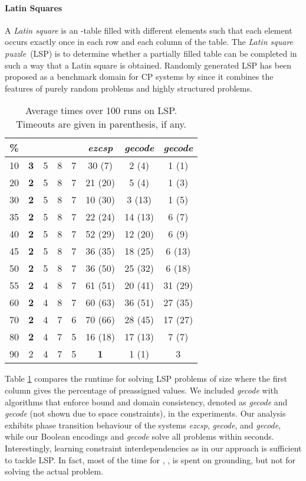 \documentclass[letterpaper]{article}
\newcommand{\systemname}[1]{\textit{#1}}
\newcommand{\encsup}{}
\newcommand{\encbou}{}
\newcommand{\encran}{}
\newcommand{\encbouh}[1]{\encbou}
\begin{document}
\paragraph{Latin Squares}
A \emph{Latin square} is an -table filled with  different elements such that each element occurs exactly once in each row and each column of the table. The \emph{Latin square puzzle}~(LSP) is to determine whether a partially filled table can be completed in such a way that a Latin square is obtained.
Randomly generated LSP has been proposed as a benchmark domain for CP systems by \citeauthor{gose97a} since it combines the features of purely random problems and highly structured problems.
\begin{table}
\centering
\begin{tabular}{cccccccc} \hline\hline
\% & \encsup & \encbouh{3} & \encbou & \encran & \systemname{ezcsp} & \systemname{gecode} & \systemname{gecode} \\ \hline
10 & \textbf{3} & 5 & 8 & 7 &30 (7)  & 2 (4) & 1 (1) \\
20 & \textbf{2} & 5 & 8 & 7 &21 (20) & 5 (4) & 1 (3) \\
30 & \textbf{2} & 5 & 8 & 7 &10 (30) & 3 (13) & 1 (5) \\
35 & \textbf{2} & 5 & 8 & 7 &22 (24) &14 (13) & 6 (7) \\
40 & \textbf{2} & 5 & 8 & 7 &52 (29) &12 (20) & 6 (9) \\
45 & \textbf{2} & 5 & 8 & 7 &36 (35) &18 (25) & 6 (13) \\
50 & \textbf{2} & 5 & 8 & 7 &36 (50) &25 (32) & 6 (18) \\
55 & \textbf{2} & 4 & 8 & 7 &61 (51) &20 (41) &31 (29) \\
60 & \textbf{2} & 4 & 8 & 7 &60 (63) &36 (51) &27 (35) \\
70 & \textbf{2} & 4 & 7 & 6 &70 (66) &28 (45) &17 (27) \\
80 & \textbf{2} & 4 & 7 & 5 &16 (18) &17 (13) & 7 (7) \\
90 & 2 & 4 & 7 & 5 & \textbf{1} & 1 (1) & 3 \\ \hline\hline
\end{tabular}
\caption{Average times over 100 runs on LSP. Timeouts are given in parenthesis, if any.\label{tab:qcp}}
\vspace{-1\baselineskip}
\end{table}
Table \ref{tab:qcp} compares the runtime for solving LSP problems of size  where the first column gives the percentage of preassigned values. We included \systemname{gecode} with algorithms that enforce bound and domain consistency, denoted as \systemname{gecode} and \systemname{gecode} (not shown due to space constraints), in the experiments. Our analysis exhibits phase transition behaviour of the systems \systemname{ezcsp}, \systemname{gecode}, and \systemname{gecode}, while our Boolean encodings and \systemname{gecode} solve all problems within seconds. Interestingly, learning constraint interdependencies as in our approach is sufficient to tackle LSP. In fact, most of the time for , ,  is spent on grounding, but not for solving the actual problem.
\end{document}

